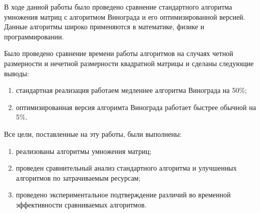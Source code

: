 \newpage
{}

В ходе данной работы было проведено сравнение стандартного алгоритма
умножения матриц с алгоритмом Винограда и его оптимизированной версией.
Данные алгоритмы широко применяются в математике, физике и
программировании.

Было проведено сравнение времени работы алгоритмов на случаях четной
размерности и нечетной размерности квадратной матрицы и сделаны
следующие выводы:

\begin{enumerate}
    \item стандартная реализация работаем медленнее алгоритма Винограда
        на 50\%;
    \item оптимизированная версия алгоримта Винограда работает быстрее
        обычной на 5\%.
\end{enumerate}

Все цели, поставленные на эту работы, были выполнены:

\begin{enumerate}
    \item реализованы алгоритмы умножения матриц;
    \item проведен сравнительный анализ стандартного алгоритма и улучшенных алгоритмов по
        затрачиваемым ресурсам;
    \item проведено экспериментальное подтверждение различий во временной эффективности
        сравниваемых алгоритмов.
\end{enumerate}
